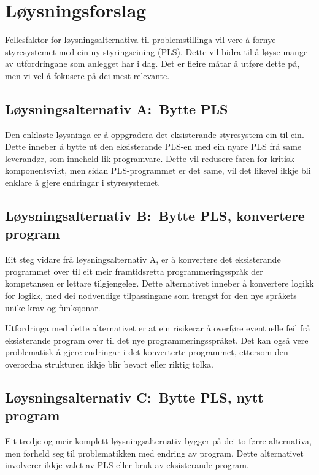 \newpage
\section{Løysningsforslag}

Fellesfaktor for løysningsalternativa til problemstillinga vil vere å fornye
styresystemet med ein ny styringseining (\gls{PLS}). 
Dette vil bidra til å løyse mange av utfordringane som anlegget har i dag.\newline
Det er fleire måtar å utføre dette på, men vi vel å fokusere på dei mest relevante.

\subsection{Løysningsalternativ A:~Bytte \gls{PLS}}
Den enklaste løysninga er å oppgradera det eksisterande styresystem ein til ein. 
Dette inneber å bytte ut den eksisterande \gls{PLS}-en med ein nyare \gls{PLS} frå same leverandør, som inneheld lik programvare.\newline
Dette vil redusere faren for kritisk komponentsvikt, men sidan \gls{PLS}-programmet er det same, 
vil det likevel ikkje bli enklare å gjere endringar i styresystemet.

\subsection{Løysningsalternativ B:~Bytte \gls{PLS}, konvertere program}
Eit steg vidare frå løysningsalternativ A, er å konvertere det eksisterande programmet over til eit meir
framtidsretta programmeringsspråk der kompetansen er lettare tilgjengeleg. Dette alternativet inneber å konvertere logikk for logikk,
med dei nødvendige tilpassingane som trengst for den nye språkets unike krav og funksjonar.

Utfordringa med dette alternativet er at ein risikerar å overføre eventuelle feil frå eksisterande
program over til det nye programmeringsspråket. Det kan også vere problematisk å gjere endringar
i det konverterte programmet, ettersom den overordna strukturen ikkje blir bevart eller riktig tolka.

\subsection{Løysningsalternativ C:~Bytte \gls{PLS}, nytt program}
Eit tredje og meir komplett løysningsalternativ bygger på dei to førre alternativa, 
men forheld seg til problematikken med endring av program.
Dette alternativet involverer ikkje valet av \gls{PLS} eller bruk av eksisterande program.

